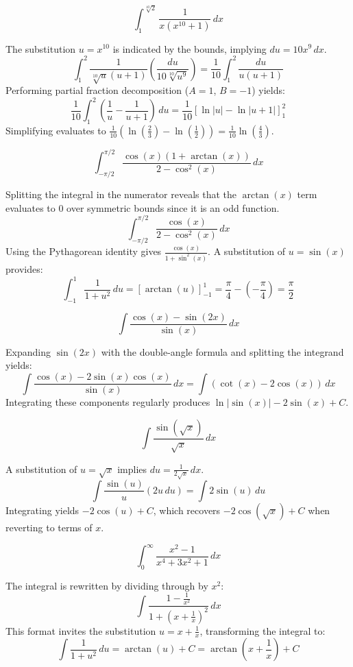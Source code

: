 \begin{questions}
    \question \[ \int_{1}^{\sqrt[10]{2}}\frac{1}{x(x^{10}+1)} \,dx \]
    \begin{solution}
        The substitution $u=x^{10}$ is indicated by the bounds, implying $du=10x^{9} \,dx$.
        \[ \int_{1}^{2}\frac{1}{\sqrt[10]{u}(u+1)}\left(\frac{du}{10\sqrt[10]{u^{9}}}\right) = \frac{1}{10}\int_{1}^{2}\frac{du}{u(u+1)} \]
        Performing partial fraction decomposition ($A=1$, $B=-1$) yields:
        \[ \frac{1}{10}\int_{1}^{2}\left(\frac{1}{u}-\frac{1}{u+1}\right) \,du = \frac{1}{10}\left[ \ln|u| - \ln|u+1| \right]_{1}^{2} \]
        Simplifying evaluates to $\frac{1}{10}\left(\ln\left(\frac{2}{3}\right)-\ln\left(\frac{1}{2}\right)\right) = \frac{1}{10}\ln\left(\frac{4}{3}\right)$.
    \end{solution}

    \question \[ \int_{-\pi/2}^{\pi/2}\frac{\cos(x)(1+\arctan(x))}{2-\cos^{2}(x)} \,dx \]
    \begin{solution}
        Splitting the integral in the numerator reveals that the $\arctan(x)$ term evaluates to $0$ over symmetric bounds since it is an odd function.
        \[ \int_{-\pi/2}^{\pi/2}\frac{\cos(x)}{2-\cos^{2}(x)} \,dx \]
        Using the Pythagorean identity gives $\frac{\cos(x)}{1+\sin^{2}(x)}$. A substitution of $u=\sin(x)$ provides:
        \[ \int_{-1}^{1}\frac{1}{1+u^{2}} \,du = \left[ \arctan(u) \right]_{-1}^{1} = \frac{\pi}{4} - \left(-\frac{\pi}{4}\right) = \frac{\pi}{2} \]
    \end{solution}

    \question \[ \int\frac{\cos(x)-\sin(2x)}{\sin(x)} \,dx \]
    \begin{solution}
        Expanding $\sin(2x)$ with the double-angle formula and splitting the integrand yields:
        \[ \int\frac{\cos(x)-2\sin(x)\cos(x)}{\sin(x)} \,dx = \int(\cot(x)-2\cos(x)) \,dx \]
        Integrating these components regularly produces $\ln|\sin(x)|-2\sin(x)+C$.
    \end{solution}

    \question \[ \int\frac{\sin(\sqrt{x})}{\sqrt{x}} \,dx \]
    \begin{solution}
        A substitution of $u=\sqrt{x}$ implies $du=\frac{1}{2\sqrt{x}} \,dx$.
        \[ \int\frac{\sin(u)}{u}(2u \,du) = \int 2\sin(u) \,du \]
        Integrating yields $-2\cos(u)+C$, which recovers $-2\cos(\sqrt{x})+C$ when reverting to terms of $x$.
    \end{solution}

    \question \[ \int_{0}^{\infty}\frac{x^{2}-1}{x^{4}+3x^{2}+1} \,dx \]
    \begin{solution}
        The integral is rewritten by dividing through by $x^{2}$:
        \[ \int\frac{1-\frac{1}{x^{2}}}{1+\left(x+\frac{1}{x}\right)^{2}} \,dx \]
        This format invites the substitution $u=x+\frac{1}{x}$, transforming the integral to:
        \[ \int\frac{1}{1+u^{2}} \,du = \arctan(u)+C = \arctan\left(x+\frac{1}{x}\right)+C \]
    \end{solution}


\end{questions}
